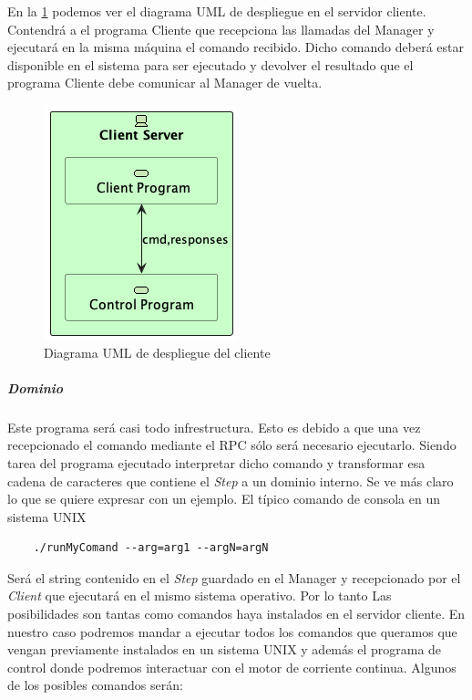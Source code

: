 
En la \cref{fig:Diagrama UML de despliegue del cliente} podemos ver el diagrama UML de despliegue en el servidor cliente. Contendrá a el programa Cliente que recepciona las llamadas del Manager y ejecutará en la misma máquina el comando recibido. Dicho comando deberá estar disponible en el sistema para ser ejecutado y devolver el resultado que el programa Cliente debe comunicar al Manager de vuelta.

\begin{figure}[H]
    \centering
    \includegraphics[height=0.2\textheight]{./part/Proyecto_ejecutivo/memoria_descriptiva/descripcionDelProyecto/client/uml/clientServerConcept}
    \caption{Diagrama UML de despliegue del cliente}\label{fig:Diagrama UML de despliegue del cliente}
\end{figure}

\subparagraph{Dominio}

Este programa será casi todo infrestructura. Esto es debido a que una vez recepcionado el comando mediante el RPC sólo será necesario ejecutarlo. Siendo tarea del programa ejecutado interpretar dicho comando y transformar esa cadena de caracteres que contiene el \textit{Step} a un dominio interno. Se ve más claro lo que se quiere expresar con un ejemplo. El típico comando de consola en un sistema UNIX

\begin{verbatim}
    ./runMyComand --arg=arg1 --argN=argN
\end{verbatim}

Será el string contenido en el \textit{Step} guardado en el Manager y recepcionado por el \textit{Client} que ejecutará en el mismo sistema operativo. Por lo tanto Las posibilidades son tantas como comandos haya instalados en el servidor cliente. En nuestro caso podremos mandar a ejecutar todos los comandos que queramos que vengan previamente instalados en un sistema UNIX y además el programa de control donde podremos interactuar con el motor de corriente continua. Algunos de los posibles comandos serán:

